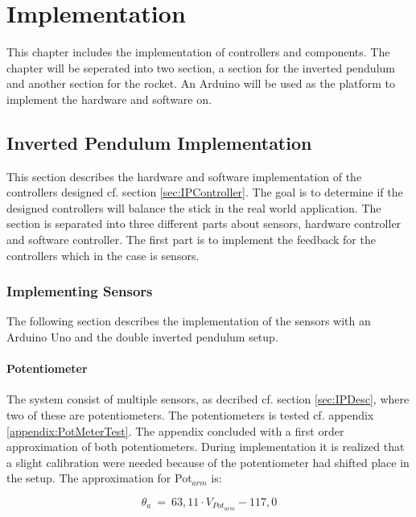 \chapter{Implementation}
This chapter includes the implementation of controllers and components. The chapter will be seperated into two section, a section for the inverted pendulum and another section for the rocket. An Arduino will be used as the platform to implement the hardware and software on.    

\section{Inverted Pendulum Implementation}\label{sec:InvPendImp}
This section describes the hardware and software implementation of the controllers designed cf. section \ref{sec:IPController}. The goal is to determine if the designed controllers will balance the stick in the real world application. The section is separated into three different parts about sensors, hardware controller and software controller. The first part is to implement the feedback for the controllers which in the case is sensors. 

\subsection{Implementing Sensors}
The following section describes the implementation of the sensors with an Arduino Uno and the double inverted pendulum setup.   

\subsubsection*{Potentiometer}\label{section:PotmeterImplementation}
The system consist of multiple sensors, as decribed cf. section \ref{sec:IPDesc}, where two of these are potentiometers. The potentiometers is tested cf. appendix \ref{appendix:PotMeterTest}. The appendix concluded with a first order approximation of both potentiometers. During implementation it is realized that a slight calibration were needed because of the potentiometer had shifted place in the setup. The approximation for Pot$_{arm}$ is:

\begin{equation}
\theta_a\ =\ 63,11 \cdot V_{{Pot}_{arm}} - 117,0
\end{equation}
\startexplain
\stopexplain

